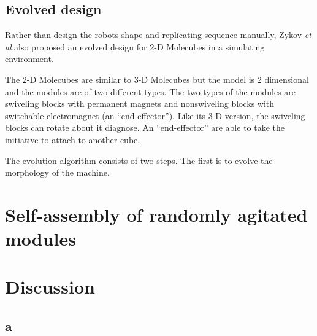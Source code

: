 \documentclass[12pt,twoside]{article}
\theoremstyle{plain}
\theoremstyle{definition}
\theoremstyle{remark}
\newcommand{\TODO}[1]{\marginpar{\emph{\small{{\bf TODO: } #1}}}}
\newcommand{\etal}{\textit{et al.}}
\begin{document}
\subsection{Evolved design}
Rather than design the robots shape and replicating sequence manually, Zykov \etal also proposed an evolved design for 2-D Molecubes in a simulating environment\cite{zykov_evolved_2007}.

The 2-D Molecubes are similar to 3-D Molecubes but the model is 2 dimensional and the modules are of two different types. The two types of the modules are swiveling blocks with permanent magnets and nonswiveling blocks with switchable electromagnet (an ``end-effector''). Like its 3-D version, the swiveling blocks can rotate about it diagnose. An ``end-effector'' are able to take the initiative to attach to another cube.

The evolution algorithm consists of two steps. The first is to evolve the morphology of the machine. 
 

\section{Self-assembly of randomly agitated modules}
\label{sec:random}

\TODO{}

\section{Discussion}
\label{sec:discuss}

\subsection{a}

\TODO{}

%
%



\end{document}
